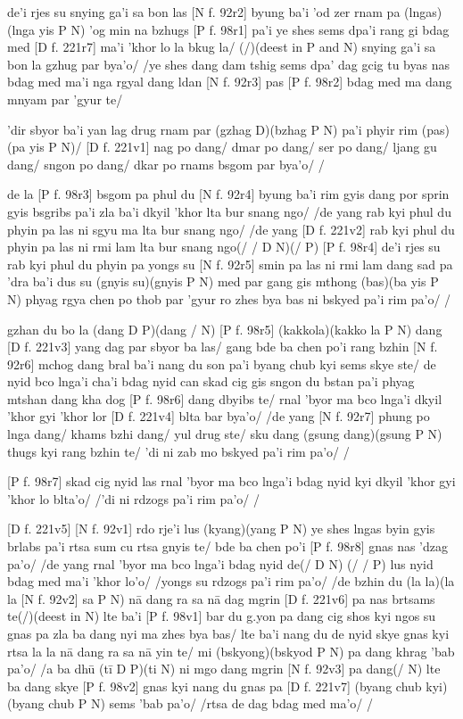 \documentclass[naipra.tex]{subfiles}
\begin{document}
de'i rjes su snying ga'i sa bon las [N f. 92r2] byung ba'i 'od zer rnam pa (lngas)(lnga yis P N) 'og min na bzhugs [P f. 98r1] pa'i ye shes sems dpa'i rang gi bdag med [D f. 221r7] ma'i 'khor lo la bkug la/ (/)(deest in P and N) snying ga'i sa bon la gzhug par bya'o/ /ye shes dang dam tshig sems dpa' dag gcig tu byas nas bdag med ma'i nga rgyal dang ldan [N f. 92r3] pas [P f. 98r2] bdag med ma dang mnyam par 'gyur te/

'dir sbyor ba'i yan lag drug rnam par (gzhag D)(bzhag P N) pa'i phyir rim (pas)(pa yis P N)/ [D f. 221v1] nag po dang/ dmar po dang/ ser po dang/ ljang gu dang/ sngon po dang/ dkar po rnams bsgom par bya'o/ /

de la [P f. 98r3] bsgom pa phul du [N f. 92r4] byung ba'i rim gyis dang por sprin gyis bsgribs pa'i zla ba'i dkyil 'khor lta bur snang ngo/ /de yang rab kyi phul du phyin pa las ni sgyu ma lta bur snang ngo/ /de yang [D f. 221v2] rab kyi phul du phyin pa las ni rmi lam lta bur snang ngo(/ / D N)(/ P) [P f. 98r4] de'i rjes su rab kyi phul du phyin pa yongs su [N f. 92r5] smin pa las ni rmi lam dang sad pa 'dra ba'i dus su (gnyis su)(gnyis P N) med par gang gis mthong (bas)(ba yis P N) phyag rgya chen po thob par 'gyur ro zhes bya bas ni bskyed pa'i rim pa'o/ /

gzhan du bo la (dang D P)(dang / N) [P f. 98r5] (kakkola)(kakko la P N) dang [D f. 221v3] yang dag par sbyor ba las/ gang bde ba chen po'i rang bzhin [N f. 92r6] mchog dang bral ba'i nang du son pa'i byang chub kyi sems skye ste/ de nyid bco lnga'i cha'i bdag nyid can skad cig gis sngon du bstan pa'i phyag mtshan dang kha dog [P f. 98r6] dang dbyibs te/ rnal 'byor ma bco lnga'i dkyil 'khor gyi 'khor lor [D f. 221v4] blta bar bya'o/ /de yang [N f. 92r7] phung po lnga dang/ khams bzhi dang/ yul drug ste/ sku dang (gsung dang)(gsung P N) thugs kyi rang bzhin te/ 'di ni zab mo bskyed pa'i rim pa'o/ /

[P f. 98r7] skad cig nyid las rnal 'byor ma bco lnga'i bdag nyid kyi dkyil 'khor gyi 'khor lo blta'o/ /'di ni rdzogs pa'i rim pa'o/ /

[D f. 221v5] [N f. 92v1] rdo rje'i lus (kyang)(yang P N) ye shes lngas byin gyis brlabs pa'i rtsa sum cu rtsa gnyis te/ bde ba chen po'i [P f. 98r8] gnas nas 'dzag pa'o/ /de yang rnal 'byor ma bco lnga'i bdag nyid de(/ D N) (/ / P) lus nyid bdag med ma'i 'khor lo'o/ /yongs su rdzogs pa'i rim pa'o/ /de bzhin du (la la)(la la [N f. 92v2] sa P N) nā dang ra sa nā dag mgrin [D f. 221v6] pa nas brtsams te(/)(deest in N) lte ba'i [P f. 98v1] bar du g.yon pa dang cig shos kyi ngos su gnas pa zla ba dang nyi ma zhes bya bas/ lte ba'i nang du de nyid skye gnas kyi rtsa la la nā dang ra sa nā yin te/ mi (bskyong)(bskyod P N) pa dang khrag 'bab pa'o/ /a ba dhū (tī D P)(ti N) ni mgo dang mgrin [N f. 92v3] pa dang(/ N) lte ba dang skye [P f. 98v2] gnas kyi nang du gnas pa [D f. 221v7] (byang chub kyi)(byang chub P N) sems 'bab pa'o/ /rtsa de dag bdag med ma'o/ /
\end{document}
